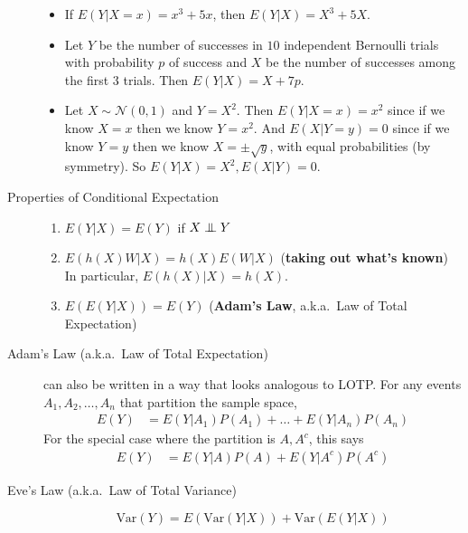 \documentclass[10pt,landscape]{article}
\newcommand\independent{\protect\mathpalette{\protect\independenT}{\perp}}
\def\independenT#1#2{\mathrel{\setbox0\hbox{$#1#2$}%
\copy0\kern-\wd0\mkern4mu\box0}}
\newcommand{\var}{\textrm{Var}}
\newcommand{\N}{\mathcal{N}}
\begin{document}
\begin{multicols*}{3}
\begin{description}
            \begin{itemize}
                \item If $E(Y|X=x) = x^3+5x$, then $E(Y|X) = X^3 + 5X$.
                \item Let $Y$ be the number of successes in $10$ independent Bernoulli trials with probability $p$ of success and $X$ be the number of successes among the first $3$ trials. Then $E(Y|X)=X+7p$.
                \item Let $X \sim \N(0,1)$ and $Y=X^2$. Then $E(Y|X=x) = x^2$ since if we know $X=x$ then we know $Y=x^2$. And $E(X|Y=y) = 0$ since if we know $Y=y$ then we know $X = \pm \sqrt{y}$, with equal probabilities (by symmetry). So $E(Y|X)=X^2, E(X|Y)=0$.
            \end{itemize}

            \item[Properties of Conditional Expectation] \quad
            \begin{enumerate}
                \item $E(Y|X) = E(Y)$ if $X \independent Y$
                \item $E(h(X)W|X) = h(X)E(W|X)$ (\textbf{taking out what's known}) \\
                In particular, $E(h(X)|X) = h(X)$.
                \item $E(E(Y|X)) = E(Y)$ (\textbf{Adam's Law}, a.k.a.~Law of Total Expectation)
            \end{enumerate}

            \item[Adam's Law (a.k.a.~Law of Total Expectation)]  can also be written in a way that looks analogous to LOTP. For any events $A_1, A_2, \dots, A_n$ that partition the sample space,
            \begin{align*}
                E(Y) & = E(Y|A_1)P(A_1) + \dots + E(Y|A_n)P(A_n)
            \end{align*}
            For the special case where the partition is $A, A^c$, this says
            \begin{align*}
                E(Y) & = E(Y|A)P(A) + E(Y|A^c)P(A^c)
            \end{align*}

            \item[Eve's Law (a.k.a.~Law of Total Variance)] \quad
            \[\var(Y) = E(\var(Y|X)) + \var(E(Y|X))\]
        \end{description}

        \hypertarget{convergence-of-random-variables}{%
}
\end{multicols*}
\end{document}
